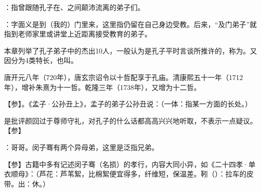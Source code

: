 {
\item {}：指曾跟随孔子在、之间颠沛流离的弟子们。%
\item {}：字面义是到（我的）门里来，这里指仍留在自己身边受教。后来，“及门弟子”就指到老师家里或讲堂上近距离接受教育的弟子。
}
{}


{
本章列举了孔子弟子中的杰出10人，一般认为是孔子平时言谈所推许的，称为。又因分为4类特长，也叫。

唐开元八年（720年），唐玄宗诏令以十哲配享于孔庙。清康熙五十一年（1712年），增补朱熹为十一哲。乾隆三年（1738年），又增为十二哲。

【参】。《孟子·公孙丑上》，孟子的弟子公孙丑说：（一体：指某一方面的长处。）
}
{
}  %


{
\item {}是批评颜回过于尊师守礼，对孔子的什么话都高高兴兴地听取，不表示一点疑议。【参】
}
{}  %


{
\begin{lyitemize}
\item {}：哥哥。闵子骞有两个异母弟，这里是泛指兄弟。
\end{lyitemize}
【参】古籍中多有记述闵子骞（名损）的孝行，内容大同小异，如《二十四孝·单衣顺母》：（芦花：芦苇絮，比棉絮便宜得多，纤维短，保温差。靷（）：拉车的皮带。出：休。）
}
{}


